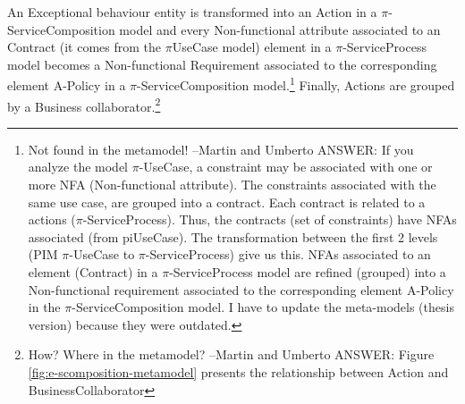 {\color{blue} An {\sf Exceptional behaviour} entity is transformed into an {\sf
Action} in a $\pi$-Serv\-ice\-Com\-po\-si\-tion model and every {\sf
Non-functional attribute} associated to an {\sf Contract} (it comes from the $\pi$UseCase model) element 
in a $\pi$-ServiceProcess model becomes a {\sf Non-functional Requirement}
associated to the corresponding element {\sf A-Policy} in a
$\pi$-ServiceComposition model}.\footnote{\color{red} Not found in the
metamodel! --Martin and Umberto \color{blue}  ANSWER:  If you analyze the model $\pi$-UseCase, a constraint may be associated with one or more NFA (Non-functional attribute). The constraints
associated with the same use case, are grouped into a contract. Each contract is
related to a actions ($\pi$-ServiceProcess). Thus, the contracts (set of
constraints) have NFAs associated (from piUseCase). The transformation between
the first 2 levels (PIM $\pi$-UseCase to $\pi$-ServiceProcess) give us this.
NFAs associated to an element (Contract) in a $\pi$-ServiceProcess model are
refined (grouped) into a Non-functional requirement associated to the corresponding
element A-Policy in the $\pi$-ServiceComposition model. I have to update the
meta-models (thesis version) because they were outdated.} Finally, {\sf Actions}
are grouped by  a {\sf Business collaborator}.\footnote{\color{red} How? Where
in the metamodel? --Martin and Umberto \color{blue} ANSWER: Figure
\ref{fig:e-scomposition-metamodel} presents the relationship between Action and BusinessCollaborator}








